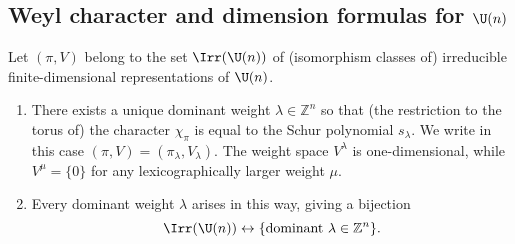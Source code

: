 \documentclass[reqno]{amsart} 
\begin{document}
\subsection{Weyl character and dimension formulas for \texorpdfstring{$\U(n)$}{U(n)}}\label{sec:cnh2voj4lf}

\begin{theorem}\label{thm:weyl-char-Un}
  Let $(\pi,V)$ belong to the set $\Irr(\U(n))$ of (isomorphism classes of) irreducible finite-dimensional representations of $\U(n)$.
  \begin{enumerate}
  \item There exists a unique dominant weight $\lambda \in \mathbb{Z}^n$ so that (the restriction to the torus of) the character $\chi_\pi$ is equal to the Schur polynomial $s_\lambda$.  We write in this case $(\pi,V) = (\pi_\lambda ,V_\lambda)$.  The weight space $V^{\lambda}$ is one-dimensional, while $V^{\mu} = \{0\}$ for any lexicographically larger weight $\mu$.
  \item Every dominant weight $\lambda$ arises in this way, giving a bijection
    \begin{equation*}
      \Irr(\U(n)) \leftrightarrow \{\text{dominant } \lambda \in \mathbb{Z}^n\}.
    \end{equation*}
  \end{enumerate}
\end{theorem}
\end{document}
